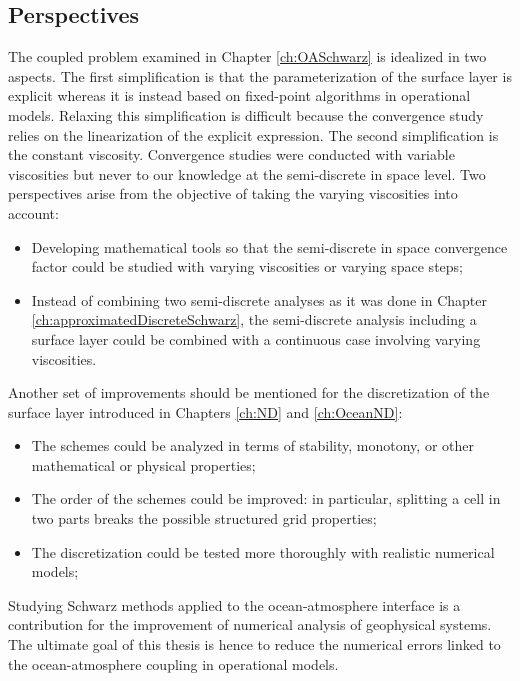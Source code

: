 \subsection*{Perspectives}
The coupled problem examined in Chapter
\ref{ch:OASchwarz} is idealized in two aspects. The first
simplification is that
the parameterization of the surface layer is explicit whereas
it is instead based on fixed-point algorithms in operational models.
Relaxing this simplification is difficult because the convergence
study relies on the linearization of the explicit expression.
The second simplification is the constant viscosity.
Convergence studies were conducted with variable viscosities but
never to our knowledge at the semi-discrete in space level.
Two perspectives arise from the objective of taking the
varying viscosities into account:
\begin{itemize}
	\item Developing mathematical tools so that the
		semi-discrete in space convergence factor could
		be studied with varying viscosities or
		varying space steps;
	\item Instead of combining two semi-discrete analyses
		as it was done in
	Chapter \ref{ch:approximatedDiscreteSchwarz}, 
	the semi-discrete analysis including a surface layer
	could be combined with a continuous case involving
	varying viscosities.
\end{itemize}
\par
Another set of improvements should be mentioned for the discretization
of the surface layer introduced in Chapters \ref{ch:ND} and
\ref{ch:OceanND}:
\begin{itemize}
\item The schemes could be analyzed in terms of stability, monotony,
	or other mathematical or physical properties;
\item The order of the schemes could be improved: in particular,
	splitting a cell in two parts breaks the possible structured
		grid properties;
\item The discretization could be tested more thoroughly with
	realistic numerical models;
\end{itemize}
\par
Studying Schwarz methods applied to the ocean-atmosphere interface
is a contribution for the improvement of numerical analysis of
geophysical systems. The ultimate goal of this thesis is
hence to reduce the numerical errors linked to the ocean-atmosphere
coupling in operational models.
